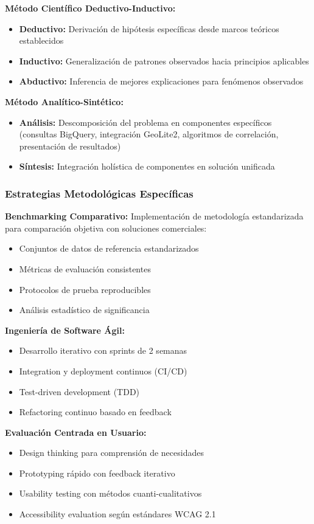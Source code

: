 \textbf{Método Científico Deductivo-Inductivo:}
\begin{itemize}
    \item \textbf{Deductivo:} Derivación de hipótesis específicas desde marcos teóricos establecidos
    \item \textbf{Inductivo:} Generalización de patrones observados hacia principios aplicables
    \item \textbf{Abductivo:} Inferencia de mejores explicaciones para fenómenos observados
\end{itemize}

\textbf{Método Analítico-Sintético:}
\begin{itemize}
    \item \textbf{Análisis:} Descomposición del problema en componentes específicos (consultas BigQuery, integración GeoLite2, algoritmos de correlación, presentación de resultados)
    \item \textbf{Síntesis:} Integración holística de componentes en solución unificada
\end{itemize}

\subsubsection{Estrategias Metodológicas Específicas}

\textbf{Benchmarking Comparativo:}
Implementación de metodología estandarizada para comparación objetiva con soluciones comerciales:
\begin{itemize}
    \item Conjuntos de datos de referencia estandarizados
    \item Métricas de evaluación consistentes
    \item Protocolos de prueba reproducibles
    \item Análisis estadístico de significancia
\end{itemize}

\textbf{Ingeniería de Software Ágil:}
\begin{itemize}
    \item Desarrollo iterativo con sprints de 2 semanas
    \item Integration y deployment continuos (CI/CD)
    \item Test-driven development (TDD)
    \item Refactoring continuo basado en feedback
\end{itemize}

\textbf{Evaluación Centrada en Usuario:}
\begin{itemize}
    \item Design thinking para comprensión de necesidades
    \item Prototyping rápido con feedback iterativo
    \item Usability testing con métodos cuanti-cualitativos
    \item Accessibility evaluation según estándares WCAG 2.1
\end{itemize}

